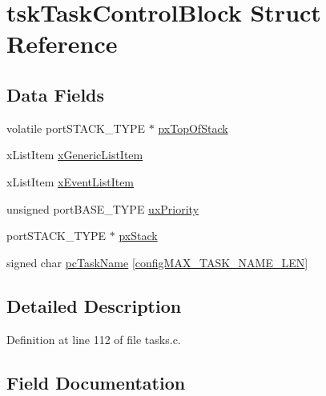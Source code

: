 \hypertarget{structtskTaskControlBlock}{}\section{tsk\+Task\+Control\+Block Struct Reference}
\label{structtskTaskControlBlock}
\subsection*{Data Fields}
\begin{DoxyCompactItemize}
\item 
volatile port\+S\+T\+A\+C\+K\+\_\+\+T\+Y\+PE $\ast$ \mbox{\hyperlink{structtskTaskControlBlock_afc326fefc205c0643b866b46422dad48}{px\+Top\+Of\+Stack}}
\item 
x\+List\+Item \mbox{\hyperlink{structtskTaskControlBlock_a95eb5853a94644043605770f63ac9a63}{x\+Generic\+List\+Item}}
\item 
x\+List\+Item \mbox{\hyperlink{structtskTaskControlBlock_a9b0ee1554f116853c7631dc0b585ffdc}{x\+Event\+List\+Item}}
\item 
unsigned port\+B\+A\+S\+E\+\_\+\+T\+Y\+PE \mbox{\hyperlink{structtskTaskControlBlock_a82357f7be508ac5d27ae7968cddde6da}{ux\+Priority}}
\item 
port\+S\+T\+A\+C\+K\+\_\+\+T\+Y\+PE $\ast$ \mbox{\hyperlink{structtskTaskControlBlock_a4586e39b121c224e22e0e84b04b8e3f3}{px\+Stack}}
\item 
signed char \mbox{\hyperlink{structtskTaskControlBlock_a11d2c88aa454db44eb0cb0184958a7b0}{pc\+Task\+Name}} \mbox{[}\mbox{\hyperlink{FreeRTOSConfig_8h_ac388dc4041aab6997348828eb27fc1a8}{config\+M\+A\+X\+\_\+\+T\+A\+S\+K\+\_\+\+N\+A\+M\+E\+\_\+\+L\+EN}}\mbox{]}
\end{DoxyCompactItemize}


\subsection{Detailed Description}


Definition at line 112 of file tasks.\+c.



\subsection{Field Documentation}
\mbox{\label{structtskTaskControlBlock_a11d2c88aa454db44eb0cb0184958a7b0}} 
